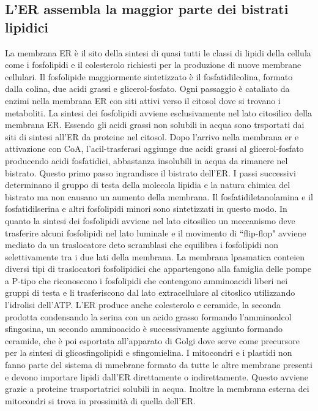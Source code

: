 \subsection{L'ER assembla la maggior parte dei bistrati lipidici}
La membrana ER \`e il sito della sintesi di quasi tutti le classi di lipidi della cellula come i fosfolipidi e il colesterolo richiesti per la produzione di nuove membrane cellulari. 
Il fosfolipide maggiormente sintetizzato \`e il fosfatidilcolina, formato dalla colina, due acidi grassi  e glicerol-fosfato. Ogni passaggio \`e cataliato da enzimi nella membrana ER
con siti attivi verso il citosol dove si trovano i metaboliti. La sintesi dei fosfolipidi avviene esclusivamente nel lato citosilico della membrana ER. Essendo gli acidi grassi non
solubili in acqua sono trsportati dai siti di sintesi all'ER da proteine nel citosol. Dopo l'arrivo nella membrana er e attivazione con CoA, l'acil-trasferasi aggiunge due acidi
grassi al glicerol-fosfato producendo acidi fosfatidici, abbastanza insolubili in acqua da rimanere nel bistrato. Questo primo passo ingrandisce il bistrato dell'ER. I passi successivi
determinano il gruppo di testa della molecola lipidia e la natura chimica del bistrato ma non causano un aumento della membrana. Il fosfatidiletanolamina e il fosfatidilserina e altri
fosfolipidi minori sono sintetizzati in questo modo. In quanto la sintesi dei fosfolipidi avviene nel lato citosilico un meccanismo deve trasferire alcuni fosfolipidi nel lato 
luminale e il movimento di ``flip-flop" avviene mediato da un traslocatore deto scramblasi che equilibra i fosfolipidi non selettivamente tra i due lati della membrana. La membrana
lpasmatica conteien diversi tipi di traslocatori fosfolipidici che appartengono alla famiglia delle pompe a P-tipo che riconoscono i fosfolipidi che contengono amminoacidi liberi nei
gruppi di testa e li trasferiscono dal lato extracellulare al citoslico utilizzando l'idrolisi dell'ATP. L'ER produce anche colesterolo e ceramide, la seconda prodotta condensando la 
serina con un acido grasso formando l'amminoalcol sfingosina, un secondo amminoacido \`e successivamente aggiunto formando ceramide, che \`e poi esportata all'apparato di Golgi dove
serve come precursore per la sintesi di glicosfingolipidi e sfingomielina. I mitocondri e i plastidi non fanno parte del sistema di mmebrane formato da tutte le altre membrane presenti
e devono importare lipidi dall'ER direttamente o indirettamente. Questo avviene grazie a proteine trasportatrici solubili in acqua. Inoltre la membrana esterna dei mitocondri si trova
in prossimit\`a di quella dell'ER. 
